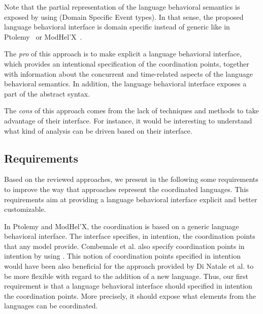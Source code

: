 {Note that the partial representation of the language behavioral semantics is exposed by using \dse (Domain Specific Event types). In that sense, the proposed language behavioral interface is domain specific instead of generic like in Ptolemy~\cite{ptoleframebib} or ModHel'X~\cite{modhelxbib}. 

The \emph{pro} of this approach is to make explicit a language behavioral interface, which provides an intentional specification of the coordination points, together with information about the concurrent and time-related aspects of the language behavioral semantics. In addition, the language behavioral interface exposes a part of the abstract syntax.   

The \emph{cons} of this approach comes from the lack of techniques and methods to take advantage of their interface. For instance, it would be interesting to understand what kind of analysis can be driven based on their interface.



\subsection{Requirements}
Based on the reviewed approaches, we present in the following some requirements to improve the way that approaches represent the coordinated languages. This requirements aim at providing a language behavioral interface explicit and better customizable.     

In Ptolemy and ModHel'X, the coordination is based on a generic language behavioral interface. The interface specifies, in intention, the coordination points that any model provide. Combemale et al. also specify coordination points in intention by using \dse. This notion of coordination points specified in intention would have been also beneficial for the approach provided by Di Natale et al. to be more flexible with regard to the addition of a new language. Thus, our first requirement is that a language behavioral interface should specified in intention the coordination points. More precisely, it should expose what elements from the languages can be coordinated.

}

